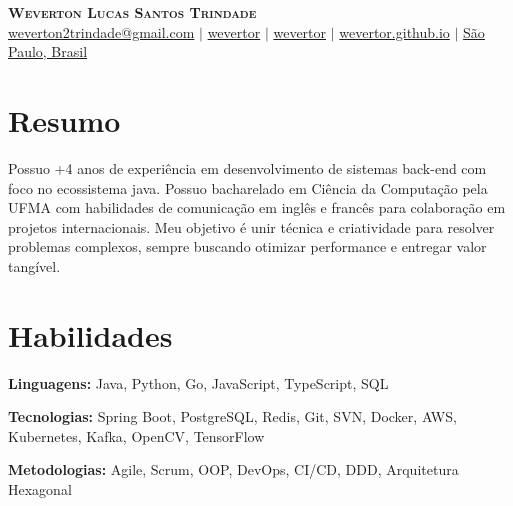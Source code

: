 \documentclass[letterpaper,11pt]{article}
\newcommand{\resumeSubHeadingListStart}{\begin{itemize}[leftmargin=0.15in, label={}]}
\newcommand{\resumeSubHeadingListEnd}{\end{itemize}}
\begin{document}

\begin{center}
    \textbf{\Huge \scshape Weverton Lucas Santos Trindade} \\ \vspace{3pt}
    \small
    \faAt \hspace{.5pt} \href{mailto:weverton2trindade@gmail.com}{weverton2trindade@gmail.com}
    $|$
    \faLinkedinSquare \hspace{.5pt} \href{https://www.linkedin.com/in/wevertor}{wevertor}
    $|$
    \faGithub \hspace{.5pt} \href{https://github.com/wevertor}{wevertor}
    $|$
    \faGlobe \hspace{.5pt} \href{https://wevertor.github.io}{wevertor.github.io}
    $|$
    \faMapMarker \hspace{.5pt} \href{https://www.google.com/maps/place/S%C3%A3o+Paulo,+SP/@-23.6824124,-46.5952992,10z}{São Paulo, Brasil}
\end{center}


\section{Resumo}
  \vspace{2pt}
  \resumeSubHeadingListStart
    \small{\item{Possuo +4 anos de experiência em desenvolvimento de sistemas back-end com foco no ecossistema java. Possuo bacharelado em Ciência da Computação pela UFMA com habilidades de comunicação em inglês e francês 
    para colaboração em projetos internacionais. Meu objetivo é unir técnica e criatividade para resolver 
    problemas complexos, sempre buscando otimizar performance e entregar valor tangível.}}
  \resumeSubHeadingListEnd


\section{Habilidades}
  \vspace{2pt}
  \resumeSubHeadingListStart
    \small{\item{
        
        \textbf{Linguagens:}{ Java, Python, Go, JavaScript, TypeScript, SQL} \\ \vspace{3pt}
        
        \textbf{Tecnologias:}{ Spring Boot, PostgreSQL, Redis, Git, SVN, Docker, AWS, Kubernetes, Kafka, OpenCV, TensorFlow} \\ \vspace{3pt}
        
        \textbf{Metodologias:}{ Agile, Scrum, OOP, DevOps, CI/CD, DDD, Arquitetura Hexagonal} \\ \vspace{3pt}
        
    }}
  \resumeSubHeadingListEnd
\end{document}
